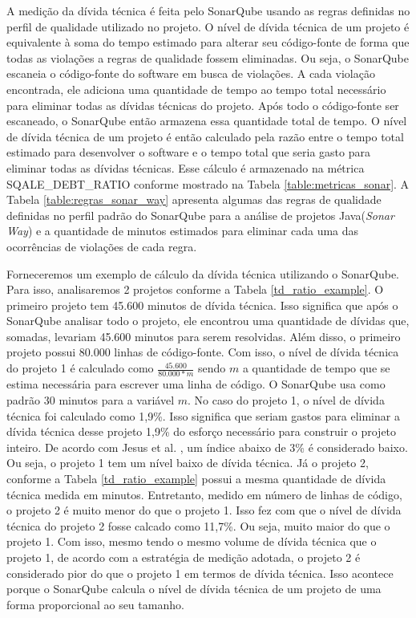 A medição da dívida técnica é feita pelo SonarQube usando as regras definidas no perfil de qualidade utilizado no projeto. O nível de dívida técnica de um projeto é equivalente à soma do tempo estimado para alterar seu código-fonte de forma que todas as violações a regras de qualidade fossem eliminadas. Ou seja, o SonarQube escaneia o código-fonte do software em busca de violações. A cada violação encontrada, ele adiciona uma quantidade de tempo ao tempo total necessário para eliminar todas as dívidas técnicas do projeto. Após todo o código-fonte ser escaneado, o SonarQube  então armazena essa quantidade total de tempo. O nível de dívida técnica de um projeto é então calculado pela razão entre o tempo total estimado para desenvolver o software  e o tempo total que seria gasto para eliminar todas as dívidas técnicas. Esse cálculo é armazenado na métrica SQALE\_DEBT\_RATIO conforme mostrado na Tabela \ref{table:metricas_sonar}. A Tabela \ref{table:regras_sonar_way} apresenta algumas das regras de qualidade definidas no perfil padrão do SonarQube para a análise de projetos Java(\textit{Sonar Way}) e a quantidade de minutos estimados para eliminar cada uma das ocorrências de violações de cada regra.  

Forneceremos um exemplo de cálculo da dívida técnica utilizando o SonarQube. Para isso, analisaremos 2 projetos conforme a Tabela \ref{td_ratio_example}. O primeiro projeto tem 45.600 minutos de dívida técnica. Isso significa que após o SonarQube analisar todo o projeto, ele encontrou uma quantidade de dívidas que, somadas, levariam 45.600 minutos para serem resolvidas. Além disso, o  primeiro projeto possui  80.000 linhas de código-fonte. Com isso, o nível de dívida técnica do projeto 1 é calculado como $\frac{45.600}{80.000*m}$ sendo $m$ a quantidade de tempo que se estima necessária para escrever uma linha de código. O SonarQube usa como padrão 30 minutos para a variável $m$. No caso do projeto 1, o nível de dívida técnica foi calculado como 1,9\%. Isso significa que seriam gastos para eliminar a dívida técnica desse projeto 1,9\% do esforço necessário para construir o projeto inteiro. De acordo com Jesus et al. \cite{de2017technical}, um índice abaixo de 3\% é considerado baixo. Ou seja, o projeto 1 tem um nível baixo de dívida técnica.  Já o projeto 2, conforme a Tabela \ref{td_ratio_example} possui a mesma quantidade de dívida técnica medida em minutos. Entretanto, medido em número de linhas de código, o projeto 2 é muito menor do que o projeto 1. Isso fez com que o nível de dívida técnica do projeto 2 fosse calcado como 11,7\%. Ou seja, muito maior do que o projeto 1. Com isso, mesmo tendo o mesmo volume de dívida técnica que o projeto 1, de acordo com a estratégia de medição adotada, o projeto 2 é considerado pior do que o projeto 1 em termos de dívida técnica. Isso acontece porque o SonarQube
calcula o nível de dívida técnica de um projeto de uma forma proporcional ao seu tamanho.


